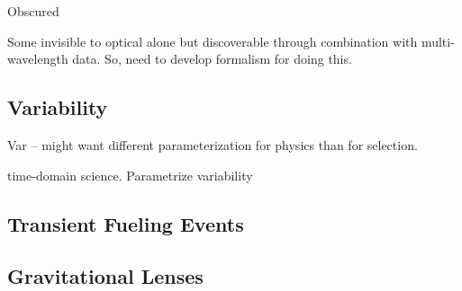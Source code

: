 Obscured

Some invisible to optical alone but discoverable through combination
with multi-wavelength data.  So, need to develop formalism for doing
this.

\subsection{Variability}

Var -- might want different parameterization for physics than for
selection.  

time-domain science.  Parametrize variability




\subsection{Transient Fueling Events}

\subsection{Gravitational Lenses}









